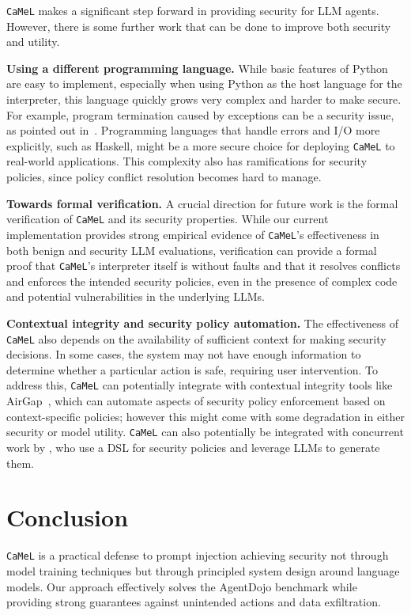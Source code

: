 \documentclass[11pt, a4paper, logo, copyright]{googledeepmind}
\newcommand{\sysname}{\texttt{CaMeL}\xspace}
\begin{document}
\sysname makes a significant step forward in providing security for LLM agents. However, there is some further work that can be done to improve both security and utility.

\textbf{Using a different programming language.} While basic features of Python are easy to implement, especially when using Python as the host language for the interpreter, this language quickly grows very complex and harder to make secure. For example, program termination caused by exceptions can be a security issue, as pointed out in~. Programming languages that handle errors and I/O more explicitly, such as Haskell, might be a more secure choice for deploying \sysname to real-world applications. This complexity also has ramifications for security policies, since policy conflict resolution becomes hard to manage.

\textbf{Towards formal verification.} A crucial direction for future work is the formal verification of \sysname{} and its security properties. While our current implementation provides strong empirical evidence of \sysname{}'s effectiveness in both benign and security LLM evaluations, verification can provide a formal proof that \sysname{}'s interpreter itself is without faults and that it resolves conflicts and enforces the intended security policies, even in the presence of complex code and potential vulnerabilities in the underlying LLMs.

\textbf{Contextual integrity and security policy automation.} The effectiveness of \sysname{} also depends on the availability of sufficient context for making security decisions. In some cases, the system may not have enough information to determine whether a particular action is safe, requiring user intervention. To address this, \sysname{} can potentially integrate with contextual integrity tools like AirGap~\citep{bagdasaryan2024air,ghalebikesabi2024operationalizing}, which can automate aspects of security policy enforcement based on context-specific policies; however this might come with some degradation in either security or model utility. \sysname{} can also potentially be integrated with concurrent work by \citet{shi2025progent}, who use a DSL for security policies and leverage LLMs to generate them.

\section{Conclusion}

\sysname{} is a practical defense to prompt injection achieving security not through model training techniques but through principled system design around language models. Our approach effectively solves the AgentDojo benchmark while providing strong guarantees against unintended actions and data exfiltration.
\end{document}
